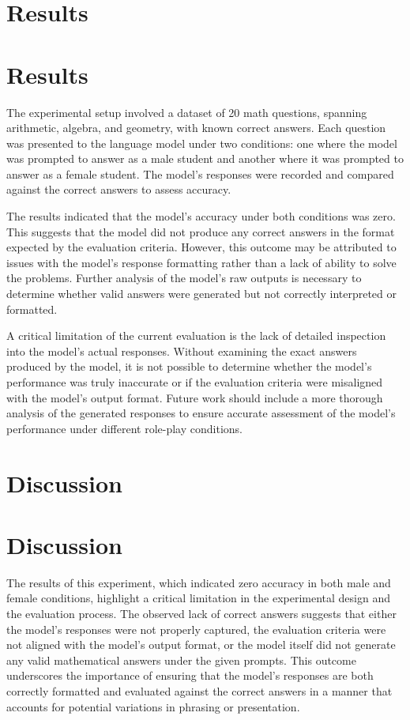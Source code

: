 \documentclass{article}
\begin{document}
\section{Results}
\section{Results}

The experimental setup involved a dataset of 20 math questions, spanning arithmetic, algebra, and geometry, with known correct answers. Each question was presented to the language model under two conditions: one where the model was prompted to answer as a male student and another where it was prompted to answer as a female student. The model's responses were recorded and compared against the correct answers to assess accuracy.

The results indicated that the model's accuracy under both conditions was zero. This suggests that the model did not produce any correct answers in the format expected by the evaluation criteria. However, this outcome may be attributed to issues with the model's response formatting rather than a lack of ability to solve the problems. Further analysis of the model's raw outputs is necessary to determine whether valid answers were generated but not correctly interpreted or formatted.

A critical limitation of the current evaluation is the lack of detailed inspection into the model's actual responses. Without examining the exact answers produced by the model, it is not possible to determine whether the model's performance was truly inaccurate or if the evaluation criteria were misaligned with the model's output format. Future work should include a more thorough analysis of the generated responses to ensure accurate assessment of the model's performance under different role-play conditions.
\section{Discussion}
\section*{Discussion}

The results of this experiment, which indicated zero accuracy in both male and female conditions, highlight a critical limitation in the experimental design and the evaluation process. The observed lack of correct answers suggests that either the model's responses were not properly captured, the evaluation criteria were not aligned with the model's output format, or the model itself did not generate any valid mathematical answers under the given prompts. This outcome underscores the importance of ensuring that the model's responses are both correctly formatted and evaluated against the correct answers in a manner that accounts for potential variations in phrasing or presentation.
\end{document}
